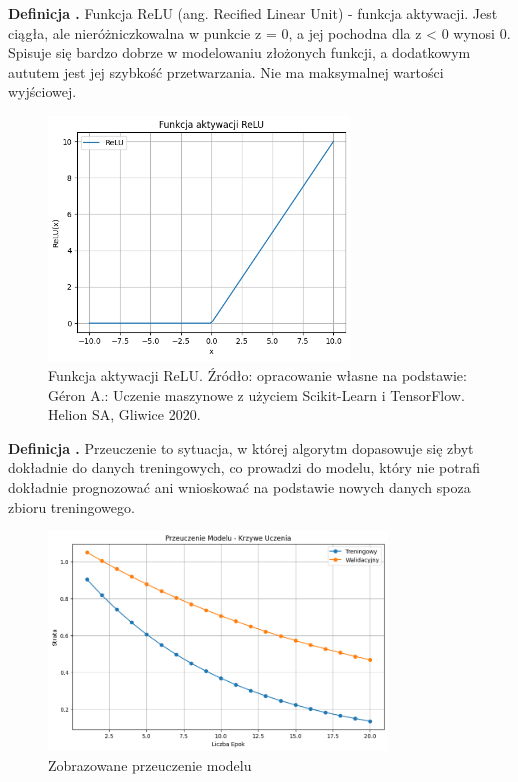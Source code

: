 \noindent
\textbf{Definicja .}
\incrementdefinitionIndex
Funkcja ReLU (ang. Recified Linear Unit) - funkcja aktywacji.
Jest ciągła, ale nieróżniczkowalna w punkcie z = 0, a jej pochodna dla z < 0 wynosi 0.
Spisuje się bardzo dobrze w modelowaniu złożonych funkcji, a dodatkowym aututem jest jej szybkość przetwarzania.
Nie ma maksymalnej wartości wyjściowej.

\begin{figure}[ht]
	\centering
	\includegraphics[width=8cm]{resources/machine-learning/images/def_relu.png}
	\caption{Funkcja aktywacji ReLU.
		Źródło: opracowanie własne na podstawie:
        Géron A.: Uczenie maszynowe z użyciem Scikit-Learn i TensorFlow. Helion SA, Gliwice 2020.}
    \label{Fig:def-1}
\end{figure}
\FloatBarrier

\noindent
\textbf{Definicja .}
\incrementdefinitionIndex
Przeuczenie to sytuacja, w której algorytm dopasowuje się zbyt dokładnie do danych treningowych,
co prowadzi do modelu, który nie potrafi dokładnie prognozować ani wnioskować na podstawie nowych danych spoza zbioru treningowego.

\begin{figure}[ht]
	\centering
	\includegraphics[width=9cm]{resources/machine-learning/images/def_overfit.png}
	\caption{Zobrazowane przeuczenie modelu}
    \label{Fig:def-2}
\end{figure}
\FloatBarrier

